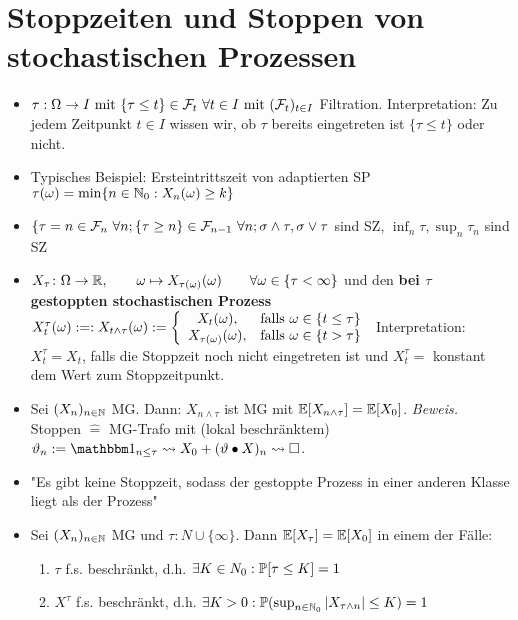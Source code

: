 \documentclass[12pt]{scrartcl}
\begin{document}
	\section{Stoppzeiten und Stoppen von stochastischen Prozessen}
	\begin{itemize}
		\item {} $\tau:\Omega\to I\mit\lbrace \tau\leq t\rbrace\in\F_t~\forall t\in I\mit (\F_t)_{t\in I}$ Filtration.
		Interpretation: Zu jedem Zeitpunkt $t\in I$ wissen wir, ob $\tau$ bereits eingetreten ist $\lbrace\tau\leq t\rbrace$ oder nicht.
		\item Typisches Beispiel: Ersteintrittszeit von adaptierten SP $\tau(\omega)=\min\lbrace n\in\N_0:X_n(\omega)\geq k\rbrace$
		\item $\lbrace \tau=n\in\F_n~\forall n;\lbrace \tau\geq n\rbrace\in\F_{n-1}~\forall n;\sigma\wedge\tau,\sigma\vee\tau$ sind SZ, $\inf_n\tau,\sup_n\tau_n$ sind SZ
		\item $X_\tau\colon\Omega\to\R,\qquad \omega\mapsto X_{\tau(\omega)}(\omega)\qquad\forall \omega\in\lbrace\tau<\infty\rbrace$
	und den \textbf{bei $\tau$ gestoppten stochastischen Prozess}
	$X_t^\tau(\omega):=:X_{t\wedge\tau}(\omega):=\left\lbrace\begin{array}{cl}
			X_t(\omega), & \falls \omega\in\lbrace t\leq\tau\rbrace\\
			X_{\tau(\omega)}(\omega), &\falls\omega\in\lbrace t>\tau\rbrace
		\end{array}\right.$
		Interpretation: $X_t^\tau=X_t$, falls die Stoppzeit noch nicht eingetreten ist und $X_t^\tau=$ konstant dem Wert zum Stoppzeitpunkt.
		\item Sei $(X_n)_{n\in\N}$ MG. Dann: $X_{n\wedge\tau}$ ist MG mit $\E[X_{n\wedge\tau}]=\E[X_0]$. \textit{Beweis.} Stoppen $\hat{=}$ MG-Trafo mit (lokal beschränktem) $\vartheta_{n}:=\indi_{n\leq\tau}\leadsto X_0+(\vartheta\bullet X)_n\leadsto\square$.
		\item "Es gibt keine Stoppzeit, sodass der gestoppte Prozess in einer anderen Klasse liegt als der Prozess" %
		\item {} Sei $(X_n)_{n\in\N}$ MG und $\tau:N\cup\lbrace\infty\rbrace$. Dann $\E[X_\tau]=\E[X_0]$ in einem der Fälle:
		\begin{enumerate}
			\item $\tau$ f.s. beschränkt, d.h. $\exists K\in N_0:\P[\tau\leq K]=1$
			\item $X^\tau$ f.s. beschränkt, d.h. $\exists K>0:\P(\sup_{n\in\N_0}|X_{\tau\wedge n}|\leq K)=1$

\end{enumerate}
\end{itemize}
\end{document}
